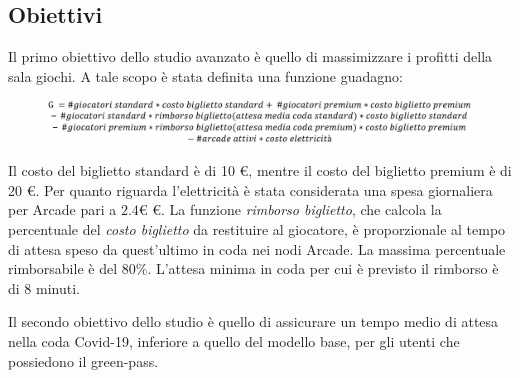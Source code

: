 \documentclass{article}
\begin{document}
\subsection{Obiettivi}
\label{Advanced_Goal}

\par Il primo obiettivo dello studio avanzato è quello di massimizzare i profitti della sala giochi. A tale scopo è stata definita una funzione guadagno:

\begin{figure}[H]
	\centering
	\captionsetup{justification=centering,margin=2cm}
	\includegraphics[scale=0.33]{images/adv_income.png}
	\label{figura:adv_income}
\end{figure}

Il costo del biglietto standard è di 10 \euro, mentre il costo del biglietto premium è di 20 \euro . Per quanto riguarda l'elettricità è stata considerata una spesa giornaliera per Arcade pari a $2.4 €$ \euro. La funzione \textit{rimborso biglietto}, che calcola la percentuale del \textit{costo biglietto} da restituire al giocatore, è proporzionale al tempo di attesa speso da quest'ultimo in coda nei nodi Arcade. La massima percentuale rimborsabile è del $80\%$. L'attesa minima in coda per cui è previsto il rimborso è di 8 minuti. 
\\
\par Il secondo obiettivo dello studio è quello di assicurare un tempo medio di attesa nella coda Covid-19, inferiore a quello del modello base, per gli utenti che possiedono il green-pass.
\end{document}
